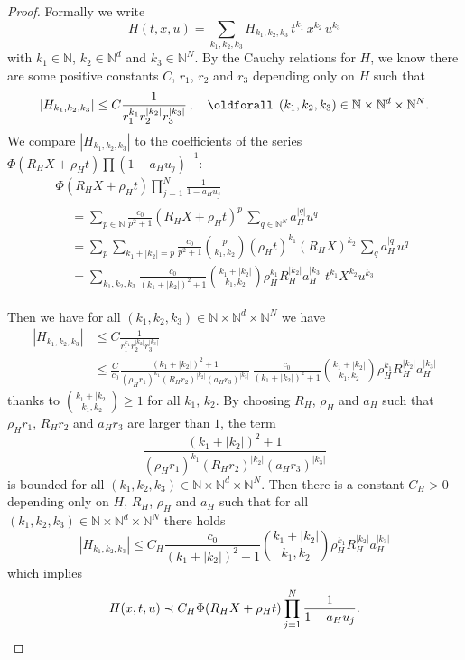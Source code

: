 \documentclass[10pt]{amsart}
\theoremstyle{definition}
\theoremstyle{plain}
\newcommand*\N{{\mathbb N}}
\newcommand*\dsp{\displaystyle}
\renewcommand*{\forall}{\mathrel{\oldforall}}
\begin{document}
\begin{proof}
Formally we write
\[
H(t,x,u) = \sum_{k_1,k_2,k_3} H_{k_1,k_2,k_3} \,t^{k_1} \,x^{k_2} \, u^{k_3}
\]
with $k_1\in\N$, $k_2\in\N^{d}$ and $k_3\in\N^{N}$. By the Cauchy relations for $H$, we know there are some positive constants $C$, $r_1$, $r_2$ and $r_3$ depending only on $H$ such that
\[
|H_{k_1,k_2,k_3}| \leq C\frac{\dsp 1}{\dsp r_1^{k_1}r_2^{|k_2|}r_3^{|k_3|}} \,, \quad \forall \,(k_1, k_2,k_3)\in\N \times\N^{d} \times \N^{N}.
\]
We compare $ |H_{k_1,k_2,k_3}| $ to the coefficients of the series $\Phi(R_HX + \rho_H t)\prod \left(1 - a_H u_j\right)^{-1}$:
\begin{multline*}
\Phi(R_HX + \rho_H t) \prod_{j=1}^{N}\frac{\dsp 1}{1 - a_Hu_j} \\
\begin{aligned}
& = \sum_{p\in\N} \frac{c_0}{p^2+1} \left(R_HX+\rho_Ht\right)^{p} \, \sum_{q\in\N^{N}} a_H^{|q|}u^{q} \\
& = \sum_{p} \sum_{k_1 + |k_2| = p} \frac{c_0}{p^2+1} \binom{p}{k_1,k_2} (\rho_H t)^{k_1} (R_HX)^{k_2} \, \sum_{q} a_H^{|q|}u^{q} \\
& = \sum_{k_1,k_2,k_3} \frac{c_0}{(k_1 + |k_2|)^2+1} \binom{k_1 + |k_2|}{k_1,k_2} \rho_H^{k_1} R_H^{|k_2|} a_H^{|k_3|} \, t^{k_1} X^{k_2} u^{k_3}
\end{aligned}
\end{multline*}


Then we have for all $(k_1, k_2,k_3)\in\N \times\N^{d} \times \N^{N}$ we have
\begin{align*}
|H_{k_1,k_2,k_3}| & \leq C\frac{\dsp 1}{\dsp r_1^{k_1}r_2^{|k_2|}r_3^{|k_3|}} \\
& \leq \frac{C}{c_0} \frac{\dsp (k_1+|k_2|)^2 + 1}{\dsp (\rho_Hr_1)^{k_1} (R_Hr_2)^{|k_2|} (a_Hr_3)^{|k_3|}} \, \frac{c_0}{(k_1+|k_2|)^2+1} \binom{k_1+|k_2|}{k_1,k_2} \rho_H^{k_1} R_H^{|k_2|} a_H^{|k_3|}
\end{align*}
thanks to $\binom{k_1+|k_2|}{k_1,k_2} \geq 1$ for all $k_1,\,k_2$. By choosing $R_H$, $\rho_H$ and $a_H$ such that $\rho_Hr_1$, $R_Hr_2$ and $a_Hr_3$ are larger than $1$, the term
\[
\frac{\dsp (k_1+|k_2|)^2 + 1}{\dsp (\rho_Hr_1)^{k_1} (R_Hr_2)^{|k_2|} (a_Hr_3)^{|k_3|}}
\]
is bounded for all $(k_1, k_2,k_3)\in\N \times\N^{d} \times \N^{N}$. Then there is a constant $C_H>0$ depending only on $H$, $R_H$, $\rho_H$ and $a_H$ such that for all $(k_1, k_2,k_3)\in\N \times\N^{d} \times \N^{N}$ there holds
\[
|H_{k_1,k_2,k_3}| \leq C_H \frac{c_0}{(k_1 + |k_2|)^2+1} \binom{k_1 + |k_2|}{k_1,k_2} \rho_H^{k_1} R_H^{|k_2|} a_H^{|k_3|}
\]
which implies
\[
H(x,t,u) \prec C_H \Phi(R_H X + \rho_H t) \prod_{j=1}^{N}\frac{\dsp 1}{1 - a_H u_j}.\qedhere
\]
\end{proof}
\end{document}
